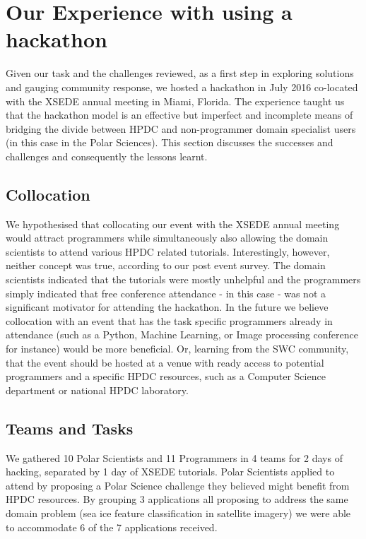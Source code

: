 \documentclass[conference]{IEEEtran}
\begin{document}
\section{Our Experience with using a hackathon}
Given our task and the challenges reviewed, as a first step in exploring solutions and gauging community response, we hosted a hackathon in July 2016 co-located with the XSEDE annual meeting in Miami, Florida. The experience taught us that the hackathon model is an effective but imperfect and incomplete means of bridging the divide between HPDC and non-programmer domain specialist users (in this case in the Polar Sciences). This section discusses the successes and challenges and consequently the lessons learnt.

\subsection{Collocation}
We hypothesised that collocating our event with the XSEDE annual meeting would attract programmers while simultaneously also allowing the domain scientists to attend various HPDC related tutorials.  Interestingly, however, neither concept was true, according to our post event survey.  The domain scientists indicated that the tutorials were mostly unhelpful and the programmers simply indicated that free conference attendance - in this case - was not a significant motivator for attending the hackathon.  In the future we believe collocation with an event that has the task specific programmers already in attendance (such as a Python, Machine Learning, or Image processing conference for instance) would be more beneficial.  Or, learning from the SWC community, that the event should be hosted at a venue with ready access to potential programmers and a specific HPDC resources, such as a Computer Science department or national HPDC laboratory.

\subsection{Teams and Tasks}
We gathered 10 Polar Scientists and 11 Programmers in 4 teams for 2 days of hacking, separated by 1 day of XSEDE tutorials.  Polar Scientists applied to attend by proposing a Polar Science challenge they believed might benefit from HPDC resources.  By grouping 3 applications all proposing to address the same domain problem (sea ice feature classification in satellite imagery) we were able to accommodate 6 of the 7 applications received. 
\end{document}
